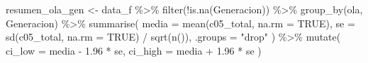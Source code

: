 \documentclass[
  spanish,
  a4paper,
  oneside]{scrbook}
\newenvironment{Shaded}{\begin{snugshade}}{\end{snugshade}}
\newcommand{\AttributeTok}[1]{\textcolor[rgb]{0.40,0.45,0.13}{#1}}
\newcommand{\ConstantTok}[1]{\textcolor[rgb]{0.56,0.35,0.01}{#1}}
\newcommand{\FloatTok}[1]{\textcolor[rgb]{0.68,0.00,0.00}{#1}}
\newcommand{\FunctionTok}[1]{\textcolor[rgb]{0.28,0.35,0.67}{#1}}
\newcommand{\NormalTok}[1]{\textcolor[rgb]{0.00,0.23,0.31}{#1}}
\newcommand{\OtherTok}[1]{\textcolor[rgb]{0.00,0.23,0.31}{#1}}
\newcommand{\SpecialCharTok}[1]{\textcolor[rgb]{0.37,0.37,0.37}{#1}}
\newcommand{\StringTok}[1]{\textcolor[rgb]{0.13,0.47,0.30}{#1}}
\begin{document}
\begin{Shaded}
\begin{Highlighting}[]
\NormalTok{resumen\_ola\_gen }\OtherTok{\textless{}{-}}\NormalTok{ data\_f }\SpecialCharTok{\%\textgreater{}\%}
  \FunctionTok{filter}\NormalTok{(}\SpecialCharTok{!}\FunctionTok{is.na}\NormalTok{(Generacion)) }\SpecialCharTok{\%\textgreater{}\%}
  \FunctionTok{group\_by}\NormalTok{(ola, Generacion) }\SpecialCharTok{\%\textgreater{}\%}
  \FunctionTok{summarise}\NormalTok{(}
    \AttributeTok{media   =} \FunctionTok{mean}\NormalTok{(c05\_total, }\AttributeTok{na.rm =} \ConstantTok{TRUE}\NormalTok{),}
    \AttributeTok{se      =} \FunctionTok{sd}\NormalTok{(c05\_total, }\AttributeTok{na.rm =} \ConstantTok{TRUE}\NormalTok{) }\SpecialCharTok{/} \FunctionTok{sqrt}\NormalTok{(}\FunctionTok{n}\NormalTok{()),}
    \AttributeTok{.groups =} \StringTok{"drop"}
\NormalTok{  ) }\SpecialCharTok{\%\textgreater{}\%}
  \FunctionTok{mutate}\NormalTok{(}
    \AttributeTok{ci\_low  =}\NormalTok{ media }\SpecialCharTok{{-}} \FloatTok{1.96} \SpecialCharTok{*}\NormalTok{ se,}
    \AttributeTok{ci\_high =}\NormalTok{ media }\SpecialCharTok{+} \FloatTok{1.96} \SpecialCharTok{*}\NormalTok{ se}
\NormalTok{  )}


\end{Highlighting}
\end{Shaded}
\end{document}
